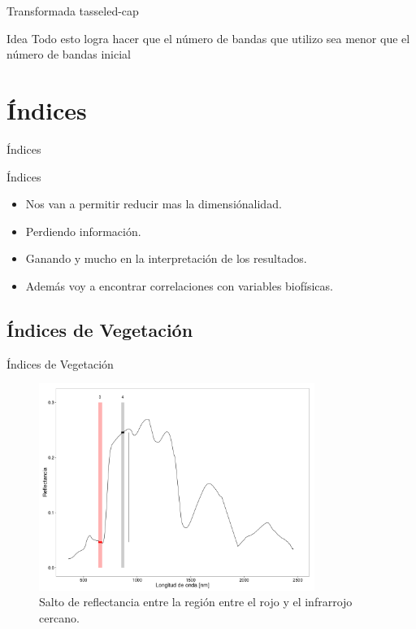 \documentclass[handout]{beamer}
\begin{document}
\begin{frame}{Transformada tasseled-cap}
  \begin{block}{Idea}
    Todo esto logra hacer que el número de bandas que utilizo sea menor que el n\'umero de bandas inicial
  \end{block}
\end{frame}

\section{\'Indices}

\begin{frame}{\'Indices}
  \begin{block}{\'Indices}
    \begin{itemize}[<+>]
      \item Nos van a permitir reducir mas la dimensiónalidad.
      \item Perdiendo información.
      \item Ganando y mucho en la interpretación de los resultados.
      \item Además voy a encontrar correlaciones con variables biof\'isicas.
    \end{itemize}
  \end{block}
\end{frame}

\subsection{\'Indices de Vegetación}

\begin{frame}{\'Indices de Vegetación}
    \begin{figure}
    \centering
    \includegraphics[width=0.8\textwidth]{imagenes/salto_nr.png}
    \caption{Salto de reflectancia entre la región entre el rojo y el infrarrojo cercano.}
    \end{figure}
\end{frame}
\end{document}
